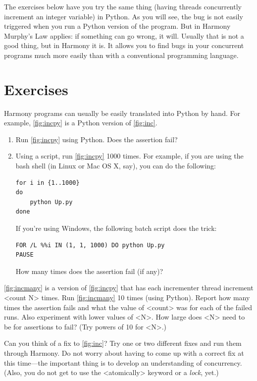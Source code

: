 \documentclass{report}
\newenvironment{code}{
\tcolorbox
}{
\endtcolorbox
}
\begin{document}
The exercises below have you try the same thing (having threads
concurrently increment an integer variable) in Python.  As you will
see, the bug is not easily triggered when you run a Python version of
the program.  But in Harmony Murphy's Law applies:
if something can go wrong, it will.  Usually that is not a good thing,
but in Harmony it is.  It allows you to find bugs in your concurrent
programs much more easily than with a conventional programming language.

\section*{Exercises}


\begin{problems}
\item Harmony programs can usually be easily translated into
Python by hand.  For example,
\autoref{fig:incpy} is a Python version of \autoref{fig:inc}.
\begin{enumerate}
\item Run \autoref{fig:incpy} using Python.  Does the assertion fail?
\item Using a script, run \autoref{fig:incpy} 1000 times.
For example, if you are using the bash shell (in Linux or Mac OS X, say), you can do the following:
\begin{code}
\begin{verbatim}
for i in {1..1000}
do
    python Up.py
done
\end{verbatim}
\end{code}
If you're using Windows, the following batch script does the trick:
\begin{code}
\begin{verbatim}
FOR /L %%i IN (1, 1, 1000) DO python Up.py
PAUSE
\end{verbatim}
\end{code}
How many times does the assertion fail (if any)?
\end{enumerate}
\item \autoref{fig:incmany} is a version of \autoref{fig:incpy} that has each
incrementer thread increment <{count N}> times.  Run \autoref{fig:incmany}
10 times (using Python).
Report how many times the assertion fails and what the value of <{count}>
was for each of the failed runs.
Also experiment with lower values of <{N}>.
How large does <{N}> need to be for assertions to fail?
(Try powers of 10 for <{N}>.)
\item Can you think of a fix to \autoref{fig:inc}?  Try one or two different fixes
and run them through Harmony.  Do not worry about having to come up with a correct fix at this
time---the important thing is to develop an understanding of concurrency.
(Also, you do not get to use the <{atomically}> keyword
or a \emph{lock}, yet.)
\end{problems}
\end{document}
